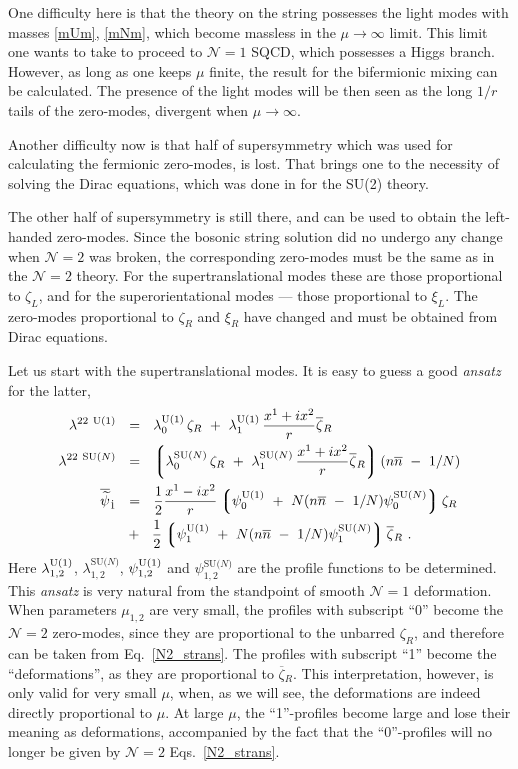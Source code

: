 \documentclass[12pt]{article}
\newcommand{\ntwo}{${\mathcal N}=2$ }
\newcommand{\none}{${\mathcal N}=1$ }
\newcommand{\wt}{\widetilde}
\newcommand{\ov}{\overline}
\newcommand{\lgr}{\left\lgroup}
\newcommand{\rgr}{\right\rgroup}
\newcommand{\bzr}{\ov{\zeta}{}_R}
\newcommand{\nbar}{\ov{n}}
\newcommand{\loU}{\lambda_0^{\rm U(1)}}
\newcommand{\llU}{\lambda_1^{\rm U(1)}}
\newcommand{\loN}{\lambda_0^\text{SU($N$)}}
\newcommand{\llN}{\lambda_1^\text{SU($N$)}}
\newcommand{\poU}{\psi_0^{\rm U(1)}}
\newcommand{\plU}{\psi_1^{\rm U(1)}}
\newcommand{\poN}{\psi_0^\text{SU($N$)}}
\newcommand{\plN}{\psi_1^\text{SU($N$)}}
\begin{document}
	One difficulty here is that the theory on the string possesses the light modes with masses \eqref{mUm}, \eqref{mNm},
	which become massless in the $ \mu \to \infty $ limit.
	This limit one wants to take to proceed to \none SQCD, which possesses a Higgs branch.
	However, as long as one keeps $ \mu $ finite, the result for the bifermionic mixing can be calculated.
	The presence of the light modes will be then seen as the long $ 1/r $ tails of the zero-modes,
	divergent when $ \mu \to \infty $.

	Another difficulty now is that half of supersymmetry which was used for calculating the fermionic zero-modes, is lost.
	That brings one to the necessity of solving the Dirac equations, which was done in \cite{SYhet} for the SU(2) theory.
	
	The other half of supersymmetry is still there, and can be used to obtain the left-handed zero-modes. 
	Since the bosonic string solution did no undergo any change when \ntwo was broken, the corresponding zero-modes
	must be the same as in the \ntwo theory.
	For the supertranslational modes these are those proportional to $ \zeta_L $, and for the superorientational
	modes --- those proportional to $ \xi_L $.
	The zero-modes proportional to $ \zeta_R $ and $ \xi_R $ have changed and must be obtained from Dirac equations. 

	Let us start with the supertranslational modes.
	It is easy to guess a good {\it ansatz} for the latter,
\begin{align}
%
\notag
	\lambda^{22\ \rm U(1)} & ~~=~~ \loU\, \zeta_R ~+~ \llU\, \frac{x^1 + i x^2}{r} \ov{\zeta}{}_R 
	\\
%
\notag
	\lambda^{22\ \text{SU($N$)}} & ~~=~~ \lgr  \loN\, \zeta_R ~+~ \llN\, \frac{x^1 + i x^2}{r} \ov{\zeta}{}_R \rgr
					( n\nbar ~-~ 1/N )
	\\
%
\label{ftprofile}
	\ov{\wt{\psi}}{}_{\dot{1}} & ~~=~~ \frac{1}{2} \frac{x^1 - i x^2}{r}
				\lgr  \poU ~+~ N (n\nbar ~-~ 1/N) \poN \rgr \zeta_R \\
\notag
				   & 
				~~+~~ \frac{1}{2} \lgr  \plU  ~+~ N (n\nbar ~-~ 1/N) \plN \rgr  \ov{\zeta}{}_R
	~.
\end{align}
	Here $ \lambda^{\rm U(1)}_{1,2} $, $ \lambda^\text{SU($N$)}_{1,2} $, $ \psi^{\rm U(1)}_{1,2} $ and
	$ \psi^\text{SU($N$)}_{1,2} $ are the profile functions to be determined.
	This {\it ansatz} is very natural from the standpoint of smooth \none deformation. 
	When parameters $ \mu_{1,2} $ are very small, the profiles with subscript ``0'' become the \ntwo zero-modes,
	since they are proportional to the unbarred $ \zeta_R $, and therefore can be taken from Eq.~\eqref{N2_strans}.
	The profiles with subscript ``1'' become the ``deformations'', as they are proportional to $ \bzr $.
	This interpretation, however, is only valid for very small $ \mu $, when, as we will see, the deformations
	are indeed directly proportional to $ \mu $.
	At large $ \mu $, the ``1''-profiles become large and lose their meaning as deformations, accompanied by the fact that 
	the ``0''-profiles will no longer be given by \ntwo Eqs.~\eqref{N2_strans}.
\end{document}
